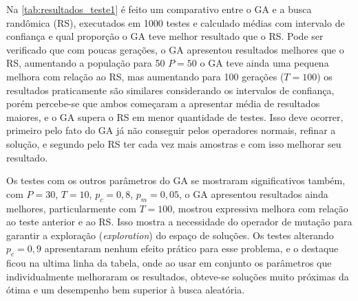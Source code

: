 Na \autoref{tab:resultados_teste1} é feito um comparativo entre o GA e a busca randômica (RS), executados em 1000 testes e calculado médias com intervalo de confiança e qual proporção o GA teve melhor resultado que o RS. Pode ser verificado que com poucas gerações, o GA apresentou resultados melhores que o RS, aumentando a população para 50 \(P=50\) o GA teve ainda uma pequena melhora com relação ao RS, mas aumentando para 100 gerações (\(T=100\)) os resultados praticamente são similares considerando os intervalos de confiança, porém percebe-se que ambos começaram a apresentar média de resultados maiores, e o GA supera o RS em menor quantidade de testes. Isso deve ocorrer, primeiro pelo fato do GA já não conseguir pelos operadores normais, refinar a solução, e segundo pelo RS ter cada vez mais amostras e com isso melhorar seu resultado.

Os testes com os outros parâmetros do GA se mostraram significativos também, com \(P = 30\), \(T = 10\), \(p_c = 0,8\), \(p_m = 0,05\), o GA apresentou resultados ainda melhores, particularmente com \(T=100\), mostrou expressiva melhora com relação ao teste anterior e ao RS. Isso mostra a necessidade do operador de mutação para garantir a exploração (\textit{exploration}) do espaço de soluções. Os testes alterando \(p_c = 0,9\) apresentaram nenhum efeito prático para esse problema, e o destaque ficou na ultima linha da tabela, onde ao usar em conjunto os parâmetros que individualmente melhoraram os resultados, obteve-se soluções muito próximas da ótima e um desempenho bem superior à busca aleatória.

